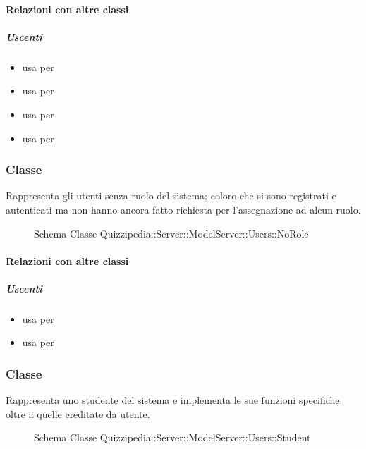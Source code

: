 \paragraph{Relazioni con altre classi}
\subparagraph{Uscenti}
\begin{itemize}
\item usa  per 
\item usa  per 
\item usa  per 
\item usa  per 
\end{itemize}
\subsubsection{Classe }
Rappresenta gli utenti senza ruolo del sistema; coloro che si sono registrati e autenticati ma non hanno ancora fatto richiesta per l'assegnazione ad alcun ruolo.
\begin{figure}[H]
\centering
\noindent{}
\caption[Schema Classe NoRole]{Schema Classe Quizzipedia::Server::ModelServer::Users::NoRole}
\end{figure}
\paragraph{Relazioni con altre classi}
\subparagraph{Uscenti}
\begin{itemize}
\item usa  per 
\item usa  per 
\end{itemize}
\subsubsection{Classe }
Rappresenta uno studente del sistema e implementa le sue funzioni specifiche oltre a quelle ereditate da utente.
\begin{figure}[H]
\centering
\noindent{}
\caption[Schema Classe Student]{Schema Classe Quizzipedia::Server::ModelServer::Users::Student}
\end{figure}
